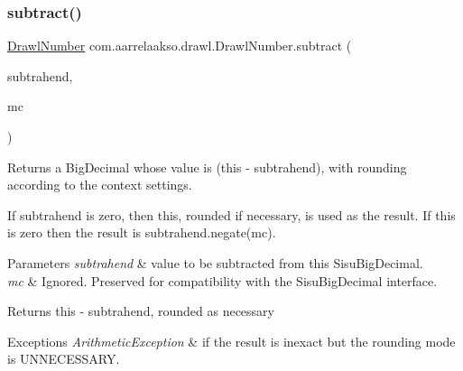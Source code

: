 \subsubsection{\texorpdfstring{subtract()}{subtract()}\hspace{0.1cm}{\footnotesize\ttfamily [2/3]}}
{\footnotesize\ttfamily \hyperlink{classcom_1_1aarrelaakso_1_1drawl_1_1_drawl_number}{Drawl\+Number} com.\+aarrelaakso.\+drawl.\+Drawl\+Number.\+subtract (\begin{DoxyParamCaption}\item[{\hyperlink{classcom_1_1aarrelaakso_1_1drawl_1_1_drawl_number}{Drawl\+Number}}]{subtrahend,  }\item[{Math\+Context}]{mc }\end{DoxyParamCaption})\hspace{0.3cm}{\ttfamily [protected]}}



Returns a Big\+Decimal whose value is (this -\/ subtrahend), with rounding according to the context settings. 

If subtrahend is zero, then this, rounded if necessary, is used as the result. If this is zero then the result is subtrahend.\+negate(mc).


\begin{DoxyParams}{Parameters}
{\em subtrahend} & value to be subtracted from this Sisu\+Big\+Decimal. \\
\hline
{\em mc} & Ignored. Preserved for compatibility with the Sisu\+Big\+Decimal interface. \\
\hline
\end{DoxyParams}
\begin{DoxyReturn}{Returns}
this -\/ subtrahend, rounded as necessary 
\end{DoxyReturn}

\begin{DoxyExceptions}{Exceptions}
{\em Arithmetic\+Exception} & if the result is inexact but the rounding mode is U\+N\+N\+E\+C\+E\+S\+S\+A\+RY. \\
\hline
\end{DoxyExceptions}
\mbox{\label{classcom_1_1aarrelaakso_1_1drawl_1_1_drawl_number_af26b18ee4dbadbad9cece6dc5e9a02ba}} 
